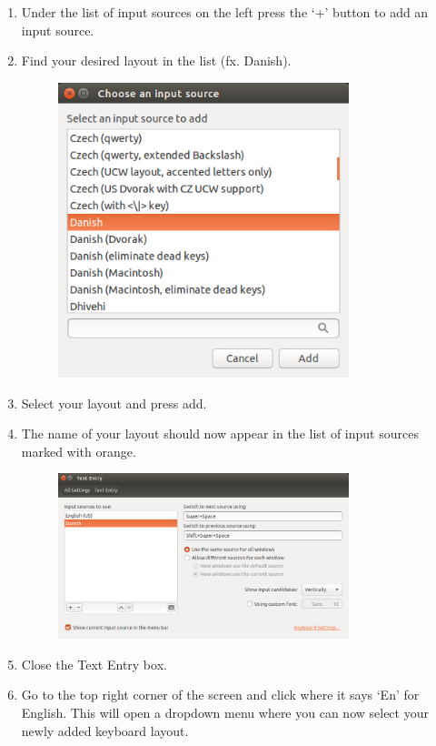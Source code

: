 \documentclass{article}
\begin{document}
\begin{enumerate}
\begin{figure}[H]
\end{figure}
\item Under the list of input sources on the left press the ‘+’ button to add an input source. 
\item Find your desired layout in the list (fx. Danish). 
\begin{figure}[H]\centering
  \includegraphics[width=0.8\textwidth]{../../Images/addingDanishLayout.png}
\end{figure}
\item Select your layout and press add. 
\item The name of your layout should now appear in the list of input sources marked with orange.
\begin{figure}[H]\centering
  \includegraphics[width=0.8\textwidth]{../../Images/danishAddedToInputSources.png}
\end{figure}
\item Close the Text Entry box.
\item Go to the top right corner of the screen and click where it says ‘En’ for English. This will open a dropdown menu where you can now select your newly added keyboard layout.

\end{enumerate}
\end{document}
